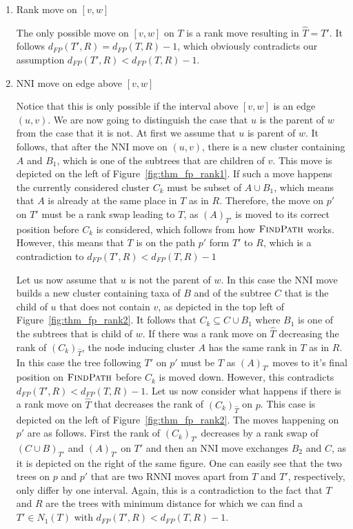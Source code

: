 \documentclass{amsart}
\newcommand{\rnni}{\mathrm{RNNI}}
\newcommand{\findpath}{\textsc{FindPath}}
\newcommand{\nni}{\mathrm{NNI}}
\begin{document}
\begin{enumerate}
    \item Rank move on $[v,w]$

    The only possible move on $[v,w]$ on $T$ is a rank move resulting in $\hat T = T'$.
    It follows $d_{FP}(T',R) = d_{FP}(T,R) - 1$, which obviously contradicts our assumption $d_{FP}(T',R) < d_{FP}(T,R) - 1$.

    \item $\nni$ move on edge above $[v,w]$

    Notice that this is only possible if the interval above $[v,w]$ is an edge $(u,v)$.
    We are now going to distinguish the case that $u$ is the parent of $w$ from the case that it is not.
    At first we assume that $u$ is parent of $w$.
    It follows, that after the $\nni$ move on $(u,v)$, there is a new cluster containing $A$ and $B_1$, which is one of the subtrees that are children of $v$.
    This move is depicted on the left of Figure~\ref{fig:thm_fp_rank1}.
    If such a move happens the currently considered cluster $C_k$ must be subset of $A \cup B_1$, which means that $A$ is already at the same place in $T$ as in $R$.
    Therefore, the move on $p'$ on $T'$ must be a rank swap leading to $T$, as $(A)_{T'}$ is moved to its correct position before $C_k$ is considered, which follows from how $\findpath$ works.
    However, this means that $T$ is on the path $p'$ form $T'$ to $R$, which is a contradiction to $d_{FP}(T',R) < d_{FP}(T,R) - 1$

    Let us now assume that $u$ is not the parent of $w$.
    In this case the $\nni$ move builds a new cluster containing taxa of $B$ and of the subtree $C$ that is the child of $u$ that does not contain $v$, as depicted in the top left of Figure~\ref{fig:thm_fp_rank2}.
    It follows that $C_k \subseteq C \cup B_1$ where $B_1$ is one of the subtrees that is child of $w$.
    If there was a rank move on $\hat T$ decreasing the rank of $(C_k)_{\hat T}$, the node inducing cluster $A$ has the same rank in $T$ as in $R$.
    In this case the tree following $T'$ on $p'$ must be $T$ as $(A)_{T'}$ moves to it's final position on $\findpath$ before $C_k$ is moved down.
    However, this contradicts $d_{FP}(T',R) < d_{FP}(T,R) - 1$.
    Let us now consider what happens if there is a rank move on $\hat T$ that decreases the rank of $(C_k)_{\hat T}$ on $p$.
    This case is depicted on the left of Figure~\ref{fig:thm_fp_rank2}.
    The moves happening on $p'$ are as follows.
    First the rank of $(C_k)_{T'}$ decreases by a rank swap of $(C \cup B)_{T'}$ and $(A)_{T'}$ on $T'$ and then an $\nni$ move exchanges $B_2$ and $C$, as it is depicted on the right of the same figure.
    One can easily see that the two trees on $p$ and $p'$ that are two $\rnni$ moves apart from $T$ and $T'$, respectively, only differ by one interval.
    Again, this is a contradiction to the fact that $T$ and $R$ are the trees with minimum distance for which we can find a $T' \in N_1(T)$ with $d_{FP}(T',R) < d_{FP}(T,R) - 1$.


\end{enumerate}
\end{document}
